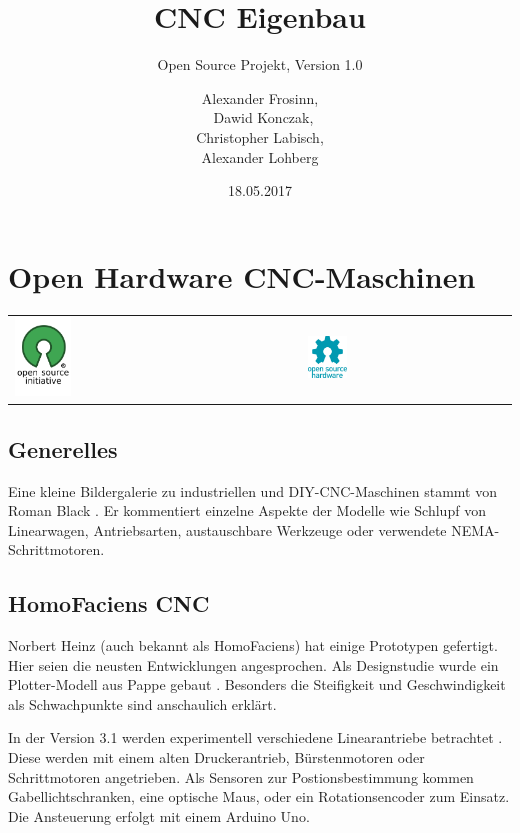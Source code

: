 \documentclass[
	a4paper,
	smallheadings,
	german,
	]
	{scrreprt}
\title{CNC Eigenbau}
\subtitle{Open Source Projekt, Version 1.0}
\date{18.05.2017}
\author{Alexander Frosinn, \\ Dawid Konczak, \\ Christopher Labisch, \\ Alexander Lohberg}
\begin{document}
\maketitle
\tableofcontents
\chapter{Open Hardware CNC-Maschinen}
\begin{tabularx}{\textwidth}{XX}
\includegraphics[width=0.2\textwidth]{../Grafiken/Opensource.png} & \includegraphics[width=0.2\textwidth]{../Grafiken/Open-source-hardware-logo.png}
\end{tabularx}
\section{Generelles}
Eine kleine Bildergalerie zu industriellen und DIY-CNC-Maschinen stammt von Roman Black \autocite{:01}.
Er kommentiert einzelne Aspekte der Modelle wie Schlupf von Linearwagen, Antriebsarten, austauschbare Werkzeuge oder verwendete NEMA-Schrittmotoren.



\section{HomoFaciens CNC}
Norbert Heinz (auch bekannt als HomoFaciens) hat einige Prototypen gefertigt.
Hier seien die neusten Entwicklungen angesprochen.
Als Designstudie wurde ein Plotter-Modell aus Pappe gebaut \autocite{:Heinz_CNC_3.0}.
Besonders die Steifigkeit und Geschwindigkeit als Schwachpunkte sind anschaulich erklärt.

In der Version 3.1 werden experimentell verschiedene Linearantriebe betrachtet \autocite{:Heinz_CNC_3.1}.
Diese werden mit einem alten Druckerantrieb, Bürstenmotoren oder Schrittmotoren angetrieben.
Als Sensoren zur Postionsbestimmung kommen Gabellichtschranken, eine optische Maus, oder ein Rotationsencoder zum Einsatz.
Die Ansteuerung erfolgt mit einem Arduino Uno.
\end{document}
